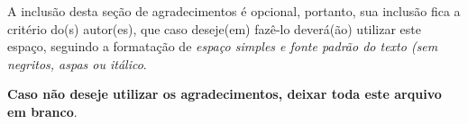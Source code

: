 \begin{agradecimentos}
A inclusão desta seção de agradecimentos é opcional, portanto, sua inclusão 
fica a critério do(s) autor(es), que caso deseje(em) fazê-lo deverá(ão) 
utilizar este espaço, seguindo a formatação de \textit{espaço simples e 
fonte padrão do texto (sem negritos, aspas ou itálico}.

\textbf{Caso não deseje utilizar os agradecimentos, deixar toda este arquivo
em branco}.
\end{agradecimentos}
